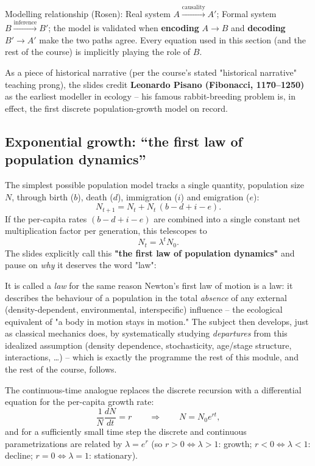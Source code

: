 \documentclass[11pt,a4paper]{article}
\begin{document}
\begin{keybox}
Modelling relationship (Rosen): Real system $A \xrightarrow{\text{causality}} A'$; Formal system $B \xrightarrow{\text{inference}} B'$; the model is validated when \textbf{encoding} $A\to B$ and \textbf{decoding} $B'\to A'$ make the two paths agree. Every equation used in this section (and the rest of the course) is implicitly playing the role of $B$.
\end{keybox}

As a piece of historical narrative (per the course's stated "historical narrative" teaching prong), the slides credit \textbf{Leonardo Pisano (Fibonacci, 1170--1250)} as the earliest modeller in ecology -- his famous rabbit-breeding problem is, in effect, the first discrete population-growth model on record.

\subsection{Exponential growth: ``the first law of population dynamics''}
The simplest possible population model tracks a single quantity, population size $N$, through birth ($b$), death ($d$), immigration ($i$) and emigration ($e$):
\[
N_{t+1} = N_t + N_t\,(b - d + i - e).
\]
If the per-capita rates $(b-d+i-e)$ are combined into a single constant net multiplication factor per generation, this telescopes to
\[
N_t = \lambda^t N_0 .
\]
The slides explicitly call this \textbf{"the first law of population dynamics"} and pause on \emph{why} it deserves the word "law":
\begin{keybox}
It is called a \emph{law} for the same reason Newton's first law of motion is a law: it describes the behaviour of a population in the total \emph{absence} of any external (density-dependent, environmental, interspecific) influence -- the ecological equivalent of "a body in motion stays in motion." The subject then develops, just as classical mechanics does, by systematically studying \emph{departures} from this idealized assumption (density dependence, stochasticity, age/stage structure, interactions, \ldots) -- which is exactly the programme the rest of this module, and the rest of the course, follows.
\end{keybox}

The continuous-time analogue replaces the discrete recursion with a differential equation for the per-capita growth rate:
\[
\frac{1}{N}\frac{dN}{dt} = r \qquad\Longrightarrow\qquad N = N_0 e^{rt},
\]
and for a sufficiently small time step the discrete and continuous parametrizations are related by $\lambda = e^{r}$ (so $r>0 \Leftrightarrow \lambda>1$: growth; $r<0 \Leftrightarrow \lambda<1$: decline; $r=0 \Leftrightarrow \lambda=1$: stationary).
\end{document}
